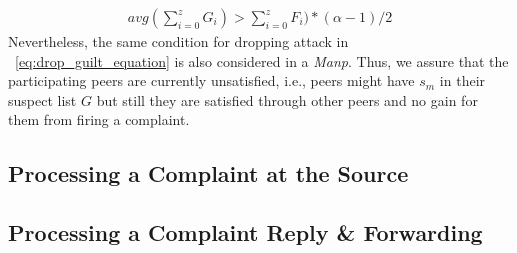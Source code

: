 \begin{align}
\label{eq:drop_guilt_equation}
avg(\sum_{i=0}^{z} G_i) > \sum_{i=0}^{z} F_i)*(\alpha-1)/2
\end{align}
Nevertheless, the same condition for dropping attack in ~\ref{eq:drop_guilt_equation} is also considered in a \textit{Manp}.
Thus, we assure that the participating peers are currently unsatisfied, i.e., peers might have $s_m$ in their suspect list $G$ but still they are satisfied through other peers and no gain for them from firing a complaint.


% 
% 
% 



\subsection{Processing a Complaint at the Source}
\label{complaint_source}

\subsection{Processing a Complaint Reply \& Forwarding}







